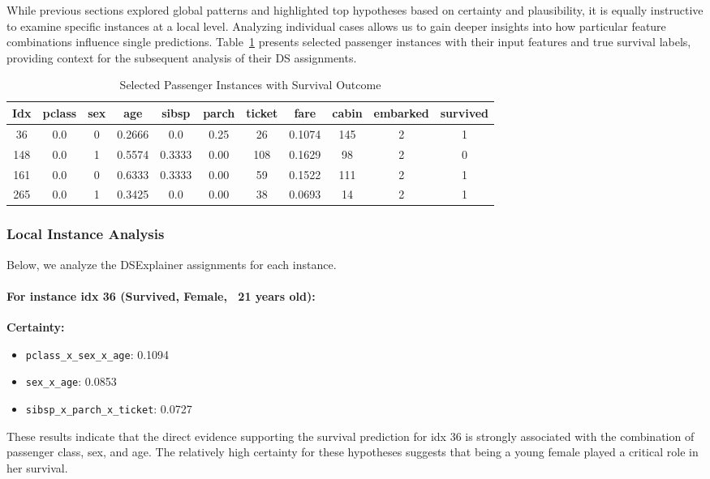 \documentclass[acmlarge]{acmart}
\begin{document}
While previous sections explored global patterns and highlighted top hypotheses based on certainty and plausibility, it is equally instructive to examine specific instances at a local level. Analyzing individual cases allows us to gain deeper insights into how particular feature combinations influence single predictions. Table~\ref{tab:instance_data_survival} presents selected passenger instances with their input features and true survival labels, providing context for the subsequent analysis of their DS assignments.

\begin{table}[H]
    \caption{Selected Passenger Instances with Survival Outcome}
    \label{tab:instance_data_survival}
    \centering
    \begin{tabular}{|c|c|c|c|c|c|c|c|c|c|c|}
        \hline
        \textbf{Idx} & \textbf{pclass} & \textbf{sex} & \textbf{age} & \textbf{sibsp} & \textbf{parch} & \textbf{ticket} & \textbf{fare} & \textbf{cabin} & \textbf{embarked} & \textbf{survived}\\
        \hline
        36  & 0.0 & 0 & 0.2666 & 0.0    & 0.25 & 26  & 0.1074 & 145 & 2 & 1 \\
        148 & 0.0 & 1 & 0.5574 & 0.3333 & 0.00 & 108 & 0.1629 & 98  & 2 & 0 \\
        161 & 0.0 & 0 & 0.6333 & 0.3333 & 0.00 & 59  & 0.1522 & 111 & 2 & 1 \\
        265 & 0.0 & 1 & 0.3425 & 0.0    & 0.00 & 38  & 0.0693 & 14  & 2 & 1 \\
        \hline
    \end{tabular}
\end{table}

\subsubsection{Local Instance Analysis}

Below, we analyze the DSExplainer assignments for each instance. 
\paragraph{For instance idx 36 (Survived, Female, ~21 years old):} 
\newline 
\textbf{Certainty:}
\begin{itemize}
    \item \texttt{pclass\_x\_sex\_x\_age}: 0.1094
    \item \texttt{sex\_x\_age}: 0.0853
    \item \texttt{sibsp_x_parch_x_ticket}: 0.0727
\end{itemize}
These results indicate that the direct evidence supporting the survival prediction for idx 36 is strongly associated with the combination of passenger class, sex, and age. The relatively high certainty for these hypotheses suggests that being a young female played a critical role in her survival.
\end{document}
